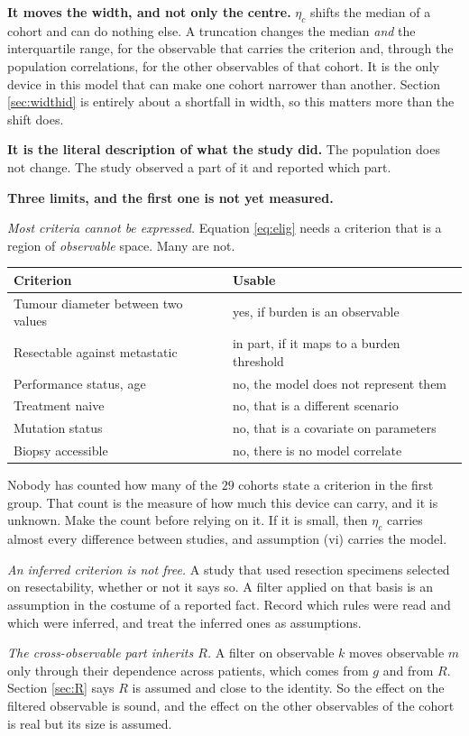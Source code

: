 \documentclass[11pt]{article}
\begin{document}
\textbf{It moves the width, and not only the centre.} $\eta_c$ shifts the median
of a cohort and can do nothing else. A truncation changes the median \emph{and}
the interquartile range, for the observable that carries the criterion and,
through the population correlations, for the other observables of that cohort. It
is the only device in this model that can make one cohort narrower than another.
Section \ref{sec:widthid} is entirely about a shortfall in width, so this matters
more than the shift does.

\textbf{It is the literal description of what the study did.} The population does
not change. The study observed a part of it and reported which part.

\begin{assumpbox}
\textbf{Three limits, and the first one is not yet measured.}

\emph{Most criteria cannot be expressed.} Equation \eqref{eq:elig} needs a
criterion that is a region of \emph{observable} space. Many are not.

\begin{center}\small
\begin{tabularx}{0.93\textwidth}{@{}Xl@{}}
\toprule
Criterion & Usable \\
\midrule
Tumour diameter between two values & yes, if burden is an observable \\
Resectable against metastatic & in part, if it maps to a burden threshold \\
Performance status, age & no, the model does not represent them \\
Treatment naive & no, that is a different scenario \\
Mutation status & no, that is a covariate on parameters \\
Biopsy accessible & no, there is no model correlate \\
\bottomrule
\end{tabularx}
\end{center}

Nobody has counted how many of the $29$ cohorts state a criterion in the first
group. That count is the measure of how much this device can carry, and it is
unknown. Make the count before relying on it. If it is small, then $\eta_c$
carries almost every difference between studies, and assumption (vi) carries the
model.

\emph{An inferred criterion is not free.} A study that used resection specimens
selected on resectability, whether or not it says so. A filter applied on that
basis is an assumption in the costume of a reported fact. Record which rules were
read and which were inferred, and treat the inferred ones as assumptions.

\emph{The cross-observable part inherits $R$.} A filter on observable $k$ moves
observable $m$ only through their dependence across patients, which comes from
$g$ and from $R$. Section \ref{sec:R} says $R$ is assumed and close to the
identity. So the effect on the filtered observable is sound, and the effect on
the other observables of the cohort is real but its size is assumed.
\end{assumpbox}
\end{document}
